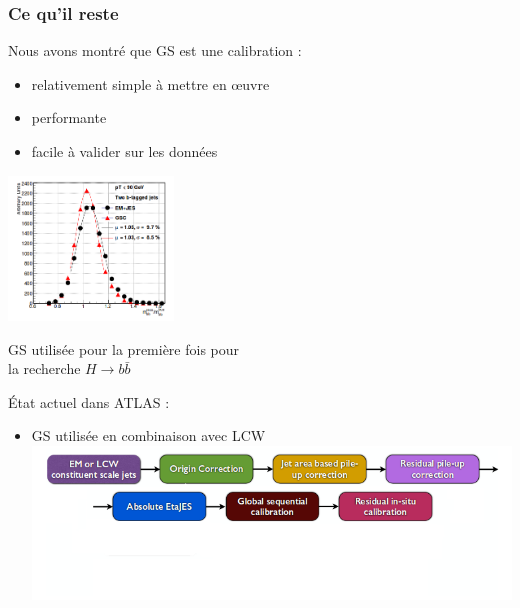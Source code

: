 \begin{frame}
\frametitle{Ce qu'il reste}
\begin{maliste}
\item Nous avons montr\'e que GS est une calibration : 
\begin{itemize}
\item relativement simple \`a mettre en \oe uvre
\item performante 
\item facile à valider sur les donn\'ees
\end{itemize}
\hspace*{7cm}
\includegraphics[width=0.33\textwidth]{Figures/JES/HbbPlotMbbVsMbbtrue.png}
\vspace*{-3.cm}
\vspace*{0.5cm}
\item GS utilis\'ee pour la premi\`ere fois pour \\la recherche $H\rightarrow b\bar{b}$
\vspace*{0.5cm}
\item \'Etat actuel dans ATLAS :
\vspace*{0.3cm}
\begin{itemize}
\item GS utilis\'ee en combinaison avec LCW
\hspace*{-0.8cm}
\includegraphics[width=1\textwidth]{Figures/JES/CurrentATLASJetCalib_modified.png}
\end{itemize}
\end{maliste}
\end{frame}

